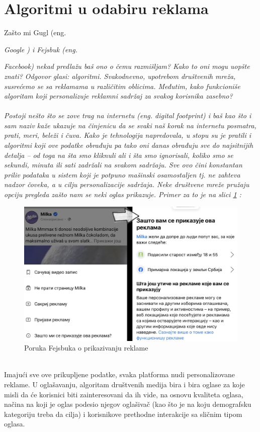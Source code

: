 \documentclass[a4paper]{article}
\begin{document}
	\section{Algoritmi u odabiru reklama}
	\label{sec:algoritmi}
	Zašto mi Gugl (eng.~{\em Google ) i Fejsbuk (eng.~{\em Facebook) nekad predlažu baš ono o čemu razmišljam? Kako to oni mogu uopšte znati? Odgovor glasi: algoritmi. Svakodnevno, upotrebom društvenih mreža, susrećemo se sa reklamama u različitim oblicima. Međutim, 		kako funkcioniše algoritam koji personalizuje reklamni sadržaj za svakog korisnika zasebno?\\ \\
	Postoji nešto što se zove trag na internetu (eng. digital footprint) i baš kao što i sam naziv kaže ukazuje na činjenicu da se svaki naš korak na internetu posmatra, prati, meri, beleži i čuva. Kako je tehnologija napredovala, u stopu su je pratili i algoritmi koji ove podatke 		obrađuju pa tako oni danas obrađuju sve do najsitnijih detalja – od toga na šta smo kliknuli ali i šta smo ignorisali, koliko smo se sekundi, minuta ili sati zadržali na svakom sadržaju. Sve ovo čini konstantan priliv podataka u sistem koji je potpuno mašinski osamostaljen tj. ne 		zahteva nadzor čoveka, a u cilju personalizacije sadržaja. Neke društvene mreže pružaju opciju pregleda zašto nam se neki oglas prikazuje. Primer za to je na slici \ref{fig:zastoreklama} : 
	 \begin{figure}[h!]
	 \begin{center}
           	 \includegraphics[scale=0.1]{zastoreklama.jpg}
      	  \end{center}
     	   \caption{Poruka Fejsbuka o prikazivanju reklame}
      	  \label{fig:zastoreklama}
            \end{figure}\\
  	 Imajući sve ove prikupljene podatke, svaka platforma nudi personalizovane reklame.  U oglašavanju, algoritam društvenih medija bira i bira oglase za koje misli da će korisnici biti zainteresovani da ih vide, na osnovu kvaliteta oglasa, načina na koji je oglas podesio njegov 		oglašivač (kao što je na koju demografsku kategoriju treba da cilja) i korisnikove prethodne interakcije sa sličnim tipom oglasa.  \cite{algoritmi}
	
}}
\end{document}
